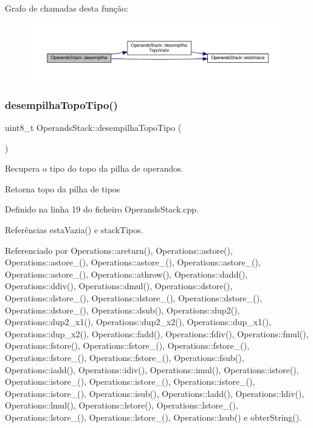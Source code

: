 Grafo de chamadas desta função\+:\nopagebreak
\begin{figure}[H]
\begin{center}
\leavevmode
\includegraphics[width=350pt]{classOperandsStack_a3213a1b633149de9332217d403ee84b6_cgraph}
\end{center}
\end{figure}
\mbox{\label{classOperandsStack_a8c76f12ad6984b3c5b4ec8807eb63ae3}} 
\subsubsection{\texorpdfstring{desempilha\+Topo\+Tipo()}{desempilhaTopoTipo()}}
{\footnotesize\ttfamily uint8\+\_\+t Operands\+Stack\+::desempilha\+Topo\+Tipo (\begin{DoxyParamCaption}{ }\end{DoxyParamCaption})}



Recupera o tipo do topo da pilha de operandos. 

Retorna topo da pilha de tipos 

Definido na linha 19 do ficheiro Operands\+Stack.\+cpp.



Referências esta\+Vazia() e stack\+Tipos.



Referenciado por Operations\+::areturn(), Operations\+::astore(), Operations\+::astore\+\_(), Operations\+::astore\+\_(), Operations\+::astore\+\_(), Operations\+::astore\+\_(), Operations\+::athrow(), Operations\+::dadd(), Operations\+::ddiv(), Operations\+::dmul(), Operations\+::dstore(), Operations\+::dstore\+\_(), Operations\+::dstore\+\_(), Operations\+::dstore\+\_(), Operations\+::dstore\+\_(), Operations\+::dsub(), Operations\+::dup2(), Operations\+::dup2\+\_\+x1(), Operations\+::dup2\+\_\+x2(), Operations\+::dup\+\_\+x1(), Operations\+::dup\+\_\+x2(), Operations\+::fadd(), Operations\+::fdiv(), Operations\+::fmul(), Operations\+::fstore(), Operations\+::fstore\+\_(), Operations\+::fstore\+\_(), Operations\+::fstore\+\_(), Operations\+::fstore\+\_(), Operations\+::fsub(), Operations\+::iadd(), Operations\+::idiv(), Operations\+::imul(), Operations\+::istore(), Operations\+::istore\+\_(), Operations\+::istore\+\_(), Operations\+::istore\+\_(), Operations\+::istore\+\_(), Operations\+::isub(), Operations\+::ladd(), Operations\+::ldiv(), Operations\+::lmul(), Operations\+::lstore(), Operations\+::lstore\+\_(), Operations\+::lstore\+\_(), Operations\+::lstore\+\_(), Operations\+::lsub() e obter\+String().

